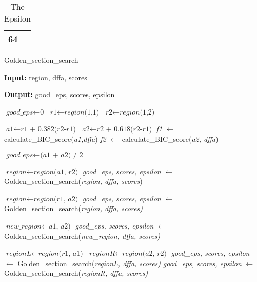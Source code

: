 \documentclass[
a4paper,     %
12pt         %
]{scrartcl}  %
\begin{document}
\begin{table}[ht!]
\centering
\begin{tabular}{|l|}
\hline
64 \\ \hline
\end{tabular}
\caption{The Epsilon}
\label{table:goodepsilon}
\end{table}

\begin{algorithm}[H]
\caption{Golden\_section\_search}\label{alg:goldensection}
\begin{algorithmic}[1]
\item \textbf{Input:} region, dffa, scores
\item \textbf{Output:} good\_eps, scores, epsilon

\State $\textit{good\_eps} \gets \textit{0}$
\State $\textit{r1} \gets \textit{region(1,1)}$
\State $\textit{r2} \gets \textit{region(1,2)}$


       \State $\textit{a1} \gets \textit{r1 + 0.382(r2-r1)}$ \label{golden:calcratio}
       \State $\textit{a2} \gets \textit{r2 + 0.618(r2-r1)}$ \label{golden:calcratio2}
       \State \textit{f1} $\gets$ calculate\_BIC\_score(\textit{a1,dffa}) \label{golden:bicscore}
       \State \textit{f2} $\gets$ calculate\_BIC\_score(\textit{a2, dffa}) \label{golden:bicscore2}

          \label{golden:condition}
       \State $\textit{good\_eps} \gets \textit{(a1 + a2) / 2}$   \label{golden:average}
        \State \Return
       \EndIf

        \State $\textit{region} \gets \textit{region(a1, r2)}$
        \State \textit{good\_eps, scores, epsilon} $\gets$ Golden\_section\_search(\textit{region, dffa, scores})
       \State \Return

        \State $\textit{region} \gets \textit{region(r1, a2)}$
        \State \textit{good\_eps, scores, epsilon} $\gets$ Golden\_section\_search(\textit{region, dffa, scores)}
        \State \Return

      \Else
          \label{golden:limit}
        \State \Return
        \EndIf

          \label{golden:maxscores}
        \State $\textit{new\_region} \gets \textit{a1, a2)}$
        \State \textit{good\_eps, scores, epsilon} $\gets$ Golden\_section\_search(\textit{new\_region, dffa, scores)}
        \State \Return

        \Else
          \State $\textit{regionL} \gets \textit{region(r1, a1)}$
          \State $\textit{regionR} \gets \textit{region(a2, r2)}$
        \State \textit{good\_eps, scores, epsilon} $\gets$ Golden\_section\_search(\textit{regionL, dffa, scores)} \label{golden:leftregion}
         \State \textit{good\_eps, scores, epsilon} $\gets$ Golden\_section\_search(\textit{regionR, dffa, scores)} \label{golden:rightregion}
        \State \Return
        \EndIf
       \EndIf

  \EndWhile
\end{algorithmic}
\end{algorithm}
\end{document}
